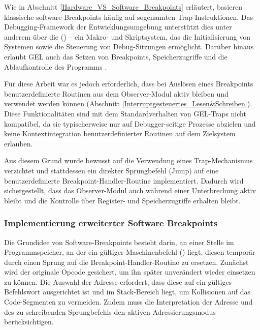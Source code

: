 Wie in Abschnitt \ref{Hardware_VS_Software_Breakpoints} erl\"autert, basieren klassische software-Breakpoints h\"aufig auf sogenannten Trap-Instruktionen. Das Debugging-Framework der Entwicklungsumgebung unterst\"utzt dies unter anderem \"uber die  () – ein Makro- und Skriptsystem, das die Initialisierung von Systemen sowie die Steuerung von Debug-Sitzungen erm\"oglicht. Dar\"uber hinaus erlaubt GEL auch das Setzen von Breakpoints, Speicherzugriffe und die Ablaufkontrolle des Programms .

F\"ur diese Arbeit war es jedoch erforderlich, dass bei Ausl\"osen eines Breakpoints benutzerdefinierte Routinen aus dem Observer-Modul aktiv bleiben und verwendet werden k\"onnen (\Vgl Abschnitt \ref{Interruptgesteuertes_Lesen&Schreiben}). Diese Funktionalit\"aten sind mit dem Standardverhalten von GEL-Traps nicht kompatibel, da sie typischerweise nur auf Debugger-seitige Prozesse abzielen und keine Kontextintegration benutzerdefinierter Routinen auf dem Zielsystem erlauben.

Aus diesem Grund wurde bewusst auf die Verwendung eines Trap-Mechanismus verzichtet und stattdessen ein direkter Sprungbefehl (Jump) auf eine benutzerdefinierte Breakpoint-Handler-Routine implementiert. Dadurch wird sichergestellt, dass das Observer-Modul auch w\"ahrend einer Unterbrechung aktiv bleibt und die Kontrolle \"uber Register- und Speicherzugriffe erhalten bleibt.

\subsubsection{Implementierung erweiterter Software Breakpoints}
\label{sec:ImplementierungSoftwareBreakpoints}

Die Grundidee von Software-Breakpoints besteht darin, an einer Stelle im Programmspeicher, an der ein g\"ultiger Maschinenbefehl () liegt, diesen tempor\"ar durch einen Sprung auf die Breakpoint-Handler-Routine zu ersetzen. Zun\"achst wird der originale Opcode gesichert, um ihn sp\"ater unver\"andert wieder einsetzen zu k\"onnen. Die Auswahl der Adresse erfordert, dass diese auf ein g\"ultiges Befehlswort ausgerichtet ist und im Stack-Bereich liegt, um Kollisionen auf das Code-Segmenten zu vermeiden. Zudem muss die Interpretation der Adresse und des zu schreibenden Sprungbefehls den aktiven Adressierungsmodus ber\"ucksichtigen.

